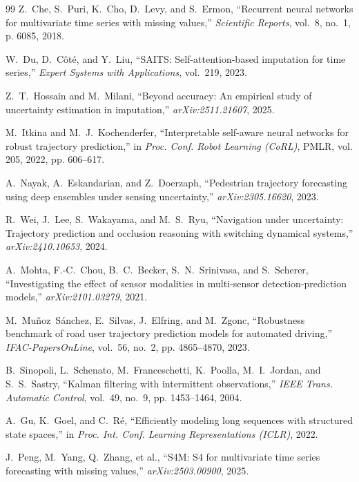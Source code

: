 \begin{thebibliography}{99}
Z.~Che, S.~Puri, K.~Cho, D.~Levy, and S.~Ermon, ``Recurrent neural networks for multivariate time series with missing values,'' \emph{Scientific Reports}, vol.~8, no.~1, p. 6085, 2018.

W.~Du, D.~C\^ot\'e, and Y.~Liu, ``SAITS: Self-attention-based imputation for time series,'' \emph{Expert Systems with Applications}, vol.~219, 2023.

Z.~T.~Hossain and M.~Milani, ``Beyond accuracy: An empirical study of uncertainty estimation in imputation,'' \emph{arXiv:2511.21607}, 2025.

M.~Itkina and M.~J.~Kochenderfer, ``Interpretable self-aware neural networks for robust trajectory prediction,'' in \emph{Proc. Conf. Robot Learning (CoRL)}, PMLR, vol. 205, 2022, pp. 606--617.

A.~Nayak, A.~Eskandarian, and Z.~Doerzaph, ``Pedestrian trajectory forecasting using deep ensembles under sensing uncertainty,'' \emph{arXiv:2305.16620}, 2023.

R.~Wei, J.~Lee, S.~Wakayama, and M.~S.~Ryu, ``Navigation under uncertainty: Trajectory prediction and occlusion reasoning with switching dynamical systems,'' \emph{arXiv:2410.10653}, 2024.

A.~Mohta, F.-C.~Chou, B.~C.~Becker, S.~N.~Srinivasa, and S.~Scherer, ``Investigating the effect of sensor modalities in multi-sensor detection-prediction models,'' \emph{arXiv:2101.03279}, 2021.

M.~Mu\~noz~S\'anchez, E.~Silvas, J.~Elfring, and M.~Zgonc, ``Robustness benchmark of road user trajectory prediction models for automated driving,'' \emph{IFAC-PapersOnLine}, vol.~56, no.~2, pp. 4865--4870, 2023.

B.~Sinopoli, L.~Schenato, M.~Franceschetti, K.~Poolla, M.~I.~Jordan, and S.~S.~Sastry, ``Kalman filtering with intermittent observations,'' \emph{IEEE Trans. Automatic Control}, vol.~49, no.~9, pp. 1453--1464, 2004.

A.~Gu, K.~Goel, and C.~R\'e, ``Efficiently modeling long sequences with structured state spaces,'' in \emph{Proc. Int. Conf. Learning Representations (ICLR)}, 2022.

J.~Peng, M.~Yang, Q.~Zhang, et al., ``S4M: S4 for multivariate time series forecasting with missing values,'' \emph{arXiv:2503.00900}, 2025.


\end{thebibliography}
